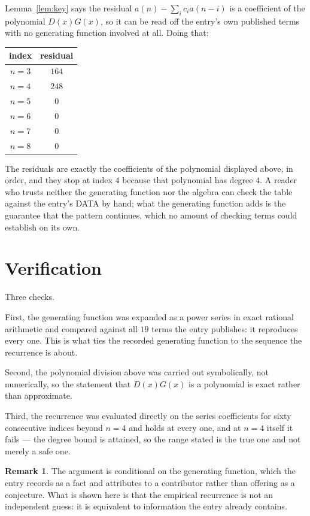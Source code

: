 \documentclass[11pt,a4paper]{article}
\theoremstyle{plain}
\theoremstyle{definition}
\newtheorem{remark}[theorem]{Remark}
\begin{document}
Lemma~\ref{lem:key} says the residual $a(n)-\sum_ic_ia(n-i)$ is a coefficient of the
polynomial $D(x)G(x)$, so it can be read off the entry's own published terms with no
generating function involved at all. Doing that:
\begin{center}
\begin{tabular}{cc}
index & residual \\ \hline
$n=3$ & $164$ \\
$n=4$ & $248$ \\
$n=5$ & $0$ \\
$n=6$ & $0$ \\
$n=7$ & $0$ \\
$n=8$ & $0$
\end{tabular}
\end{center}
The residuals are exactly the coefficients of the polynomial displayed above, in order, and
they stop at index $4$ because that polynomial has degree $4$. A reader who trusts
neither the generating function nor the algebra can check the table against the entry's DATA
by hand; what the generating function adds is the guarantee that the pattern continues, which
no amount of checking terms could establish on its own.

\section{Verification}

Three checks.

First, the generating function was expanded as a power series in exact rational arithmetic and
compared against all $19$ terms the entry publishes: it reproduces every one. This is
what ties the recorded generating function to the sequence the recurrence is about.

Second, the polynomial division above was carried out symbolically, not numerically, so the
statement that $D(x)G(x)$ is a polynomial is exact rather than approximate.

Third, the recurrence was evaluated directly on the series coefficients for sixty consecutive
indices beyond $n=4$ and holds at every one, and at $n=4$ itself it fails --- the
degree bound is attained, so the range stated is the true one and not merely a safe one.

\begin{remark}
The argument is conditional on the generating function, which the entry records as a fact and
attributes to a contributor rather than offering as a conjecture. What is shown here is that
the empirical recurrence is not an independent guess: it is equivalent to information the
entry already contains.
\end{remark}
\end{document}
